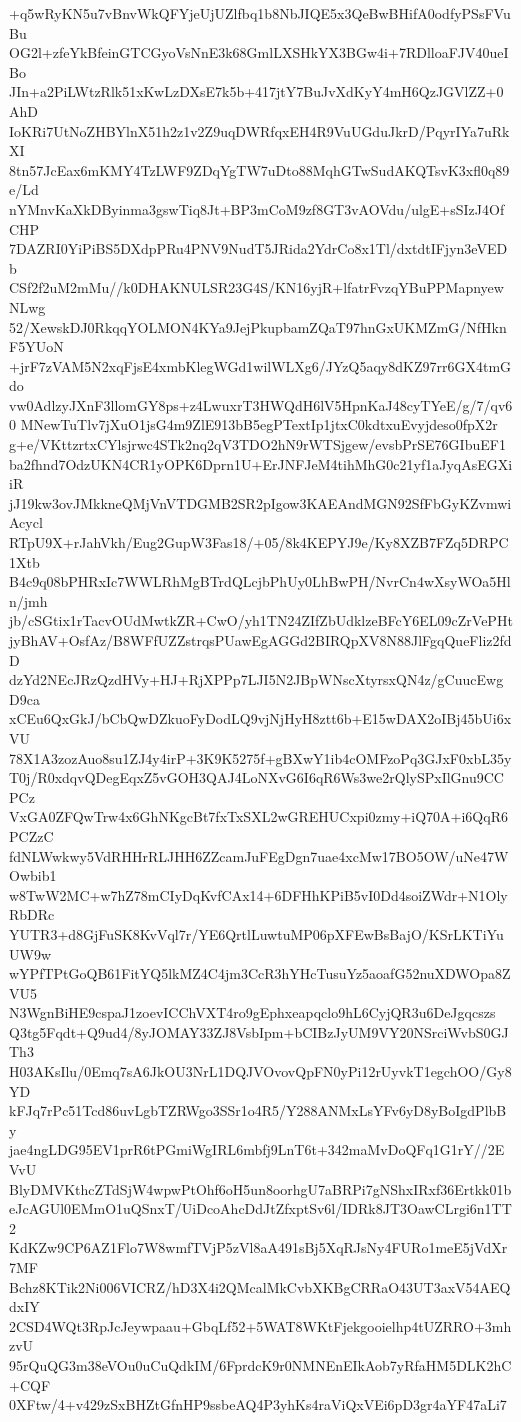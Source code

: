 +q5wRyKN5u7vBnvWkQFYjeUjUZlfbq1b8NbJIQE5x3QeBwBHifA0odfyPSsFVuBu
OG2l+zfeYkBfeinGTCGyoVsNnE3k68GmlLXSHkYX3BGw4i+7RDlloaFJV40ueIBo
JIn+a2PiLWtzRlk51xKwLzDXsE7k5b+417jtY7BuJvXdKyY4mH6QzJGVlZZ+0AhD
IoKRi7UtNoZHBYlnX51h2z1v2Z9uqDWRfqxEH4R9VuUGduJkrD/PqyrIYa7uRkXI
8tn57JcEax6mKMY4TzLWF9ZDqYgTW7uDto88MqhGTwSudAKQTsvK3xfl0q89e/Ld
nYMnvKaXkDByinma3gswTiq8Jt+BP3mCoM9zf8GT3vAOVdu/ulgE+sSIzJ4OfCHP
7DAZRI0YiPiBS5DXdpPRu4PNV9NudT5JRida2YdrCo8x1Tl/dxtdtIFjyn3eVEDb
CSf2f2uM2mMu//k0DHAKNULSR23G4S/KN16yjR+lfatrFvzqYBuPPMapnyewNLwg
52/XewskDJ0RkqqYOLMON4KYa9JejPkupbamZQaT97hnGxUKMZmG/NfHknF5YUoN
+jrF7zVAM5N2xqFjsE4xmbKlegWGd1wilWLXg6/JYzQ5aqy8dKZ97rr6GX4tmGdo
vw0AdlzyJXnF3llomGY8ps+z4LwuxrT3HWQdH6lV5HpnKaJ48cyTYeE/g/7/qv60
MNewTuTlv7jXuO1jsG4m9ZlE913bB5egPTextIp1jtxC0kdtxuEvyjdeso0fpX2r
g+e/VKttzrtxCYlsjrwc4STk2nq2qV3TDO2hN9rWTSjgew/evsbPrSE76GIbuEF1
ba2fhnd7OdzUKN4CR1yOPK6Dprn1U+ErJNFJeM4tihMhG0c21yf1aJyqAsEGXiiR
jJ19kw3ovJMkkneQMjVnVTDGMB2SR2pIgow3KAEAndMGN92SfFbGyKZvmwiAcycl
RTpU9X+rJahVkh/Eug2GupW3Fas18/+05/8k4KEPYJ9e/Ky8XZB7FZq5DRPC1Xtb
B4c9q08bPHRxIc7WWLRhMgBTrdQLcjbPhUy0LhBwPH/NvrCn4wXsyWOa5Hln/jmh
jb/cSGtix1rTacvOUdMwtkZR+CwO/yh1TN24ZIfZbUdklzeBFcY6EL09cZrVePHt
jyBhAV+OsfAz/B8WFfUZZstrqsPUawEgAGGd2BIRQpXV8N88JlFgqQueFliz2fdD
dzYd2NEcJRzQzdHVy+HJ+RjXPPp7LJI5N2JBpWNscXtyrsxQN4z/gCuucEwgD9ca
xCEu6QxGkJ/bCbQwDZkuoFyDodLQ9vjNjHyH8ztt6b+E15wDAX2oIBj45bUi6xVU
78X1A3zozAuo8su1ZJ4y4irP+3K9K5275f+gBXwY1ib4cOMFzoPq3GJxF0xbL35y
T0j/R0xdqvQDegEqxZ5vGOH3QAJ4LoNXvG6I6qR6Ws3we2rQlySPxIlGnu9CCPCz
VxGA0ZFQwTrw4x6GhNKgcBt7fxTxSXL2wGREHUCxpi0zmy+iQ70A+i6QqR6PCZzC
fdNLWwkwy5VdRHHrRLJHH6ZZcamJuFEgDgn7uae4xcMw17BO5OW/uNe47WOwbib1
w8TwW2MC+w7hZ78mCIyDqKvfCAx14+6DFHhKPiB5vI0Dd4soiZWdr+N1OlyRbDRc
YUTR3+d8GjFuSK8KvVql7r/YE6QrtlLuwtuMP06pXFEwBsBajO/KSrLKTiYuUW9w
wYPfTPtGoQB61FitYQ5lkMZ4C4jm3CcR3hYHcTusuYz5aoafG52nuXDWOpa8ZVU5
N3WgnBiHE9cspaJ1zoevICChVXT4ro9gEphxeapqclo9hL6CyjQR3u6DeJgqcszs
Q3tg5Fqdt+Q9ud4/8yJOMAY33ZJ8VsbIpm+bCIBzJyUM9VY20NSrciWvbS0GJTh3
H03AKsIlu/0Emq7sA6JkOU3NrL1DQJVOvovQpFN0yPi12rUyvkT1egchOO/Gy8YD
kFJq7rPc51Tcd86uvLgbTZRWgo3SSr1o4R5/Y288ANMxLsYFv6yD8yBoIgdPlbBy
jae4ngLDG95EV1prR6tPGmiWgIRL6mbfj9LnT6t+342maMvDoQFq1G1rY//2EVvU
BlyDMVKthcZTdSjW4wpwPtOhf6oH5un8oorhgU7aBRPi7gNShxIRxf36Ertkk01b
eJcAGUl0EMmO1uQSnxT/UiDcoAhcDdJtZfxptSv6l/IDRk8JT3OawCLrgi6n1TT2
KdKZw9CP6AZ1Flo7W8wmfTVjP5zVl8aA491sBj5XqRJsNy4FURo1meE5jVdXr7MF
Bchz8KTik2Ni006VICRZ/hD3X4i2QMcalMkCvbXKBgCRRaO43UT3axV54AEQdxIY
2CSD4WQt3RpJcJeywpaau+GbqLf52+5WAT8WKtFjekgooielhp4tUZRRO+3mhzvU
95rQuQG3m38eVOu0uCuQdkIM/6FprdcK9r0NMNEnEIkAob7yRfaHM5DLK2hC+CQF
0XFtw/4+v429zSxBHZtGfnHP9ssbeAQ4P3yhKs4raViQxVEi6pD3gr4aYF47aLi7

